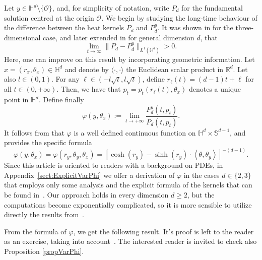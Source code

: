\documentclass[12pt,longbibliography]{article}
\def\R{\mathbb{R}}
\def\S{\mathbb{S}}
\def\R{\mathbb{R}}
\def\H{\mathbb{H}}
\theoremstyle{definition}
\theoremstyle{remark}
\theoremstyle{example}
\begin{document}
Let \( y \in \mathbb{H}^d \setminus \{\mathcal{O}\} \), and, for simplicity of notation, write $P_d$ for the fundamental solution centred at the origin $\mathcal{O}$. We begin by studying the long-time behaviour of the difference between the heat kernels \( P_d \) and \( P_d^y \). It was shown in \cite{vazquez1992asymptotic} for the three-dimensional case, and later extended in \cite{APZ} for general dimension \( d \), that
\[
\lim_{t \to \infty} \| P_d - P_d^y \|_{L^1(\mathbb{H}^d)} > 0.
\]
Here, one can improve on this result by incorporating geometric information. Let $x = (r_x, \theta_x)\in\H^d$ and
denote by $\langle\cdot, \cdot \rangle$ the Euclidean scalar product in $\R^d$. Let also $l\in(0,1)$. For any $\ell \in (-l  \sqrt{t}, l \sqrt{t})$, define $r_{\ell} (t) = (d-1)t+ \ell$ for all $t \in (0,+\infty)$. Then,  we have that $p_t=p_t(r_\ell(t), \theta_x)$ denotes a unique point in $\H^d$. Define finally
\begin{equation}\label{eq:limitQuotient}
	\varphi (y, \theta_x):= \displaystyle\lim_{t \to +\infty} \frac{P_d^y (t,p_t)}{ P_d (t,p_t)} .
\end{equation}
It follows from \cite[Proposition 3.7]{APZ} that $\varphi$ is a well defined continuous function on $\H^d \times \S^{d-1}$, and~\cite[Appendix]{Papageorgiou2025} provides the specific formula
\[
\varphi(y, \theta_x)=\varphi(r_y, \theta_y, \theta_x)=[\cosh(r_y)-\sinh(r_y)\cdot\left\langle \theta, \theta_y\right\rangle]^{-(d-1)}.
\]
Since this article is oriented to readers with a background on PDEs, in Appendix~\ref{sect:ExplicitVarPhi} we offer a derivation of $\varphi$ in the cases $d \in \{2,3\}$ that employs only some analysis and the explicit formula of the kernels that can be found in~\cite{Davies_1989,Grigor'yan,grigoryan1998heat}. Our approach holds in every dimension $d\geq 2$, but the computations become exponentially complicated, so it is more sensible to utilize directly the results from~\cite[Appendix]{Papageorgiou2025}.

From the formula of $\varphi$, we get the following result. It's proof is left to the reader as an exercise, taking into account~\cite[Proposition A.1]{LM}. The interested reader is invited to check also Proposition \ref{propVarPhi}.
\end{document}
